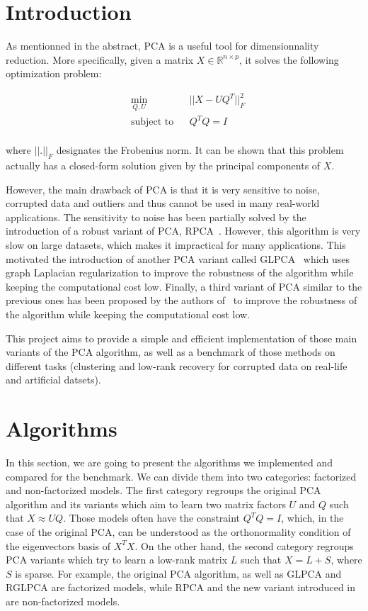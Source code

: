 \documentclass[sigconf]{acmart}
\begin{document}
\section{Introduction}

As mentionned in the abstract, PCA is a useful tool for dimensionnality reduction. More specifically, given a matrix $X \in \mathbb{R}^{n \times p}$, it solves the following optimization problem:

\begin{equation*}
  \begin{aligned}
  & \underset{Q, U}{\min}
  & & ||X - UQ^T||_F^2 \\
  & \text{subject to}
  & & Q^TQ = I \\
  \end{aligned}
\end{equation*}

  where $||.||_F$ designates the Frobenius norm. It can be shown that this problem actually has a closed-form solution given by the principal components of $X$.

However, the main drawback of PCA is that it is very sensitive to noise, corrupted data and outliers and thus cannot be used in many real-world applications.
The sensitivity to noise has been partially solved by the introduction of a robust variant of PCA, RPCA~\cite{rpca_paper}. However, this algorithm is very slow on large datasets, which makes it impractical for many applications. 
This motivated the introduction of another PCA variant called GLPCA~\cite{glpca_paper} which uses graph Laplacian regularization to improve the robustness of the algorithm while keeping the computational cost low.
Finally, a third variant of PCA similar to the previous ones has been proposed by the authors of~\cite{main_paper} to improve the robustness of the algorithm while keeping the computational cost low.

This project aims to provide a simple and efficient implementation of those main variants of the PCA algorithm, as well as a benchmark of those methods on different tasks (clustering and low-rank recovery for corrupted data on real-life and artificial datsets).

\section{Algorithms}

In this section, we are going to present the algorithms we implemented and compared for the benchmark.
We can divide them into two categories: factorized and non-factorized models. The first category regroups the original PCA algorithm and its variants which aim to learn two matrix factors $U$ and $Q$ such that $X \approx UQ$. Those models often have the constraint $Q^TQ= I$, which, in the case of the original PCA, can be understood as the orthonormality condition of the eigenvectors basis of $X^TX$. On the other hand, the second category regroups PCA variants which try to learn a low-rank matrix $L$ such that $X = L + S$, where $S$ is sparse.
For example, the original PCA algorithm, as well as GLPCA and RGLPCA are factorized models, while RPCA and the new variant introduced in~\cite{main_paper} are non-factorized models.
\end{document}
